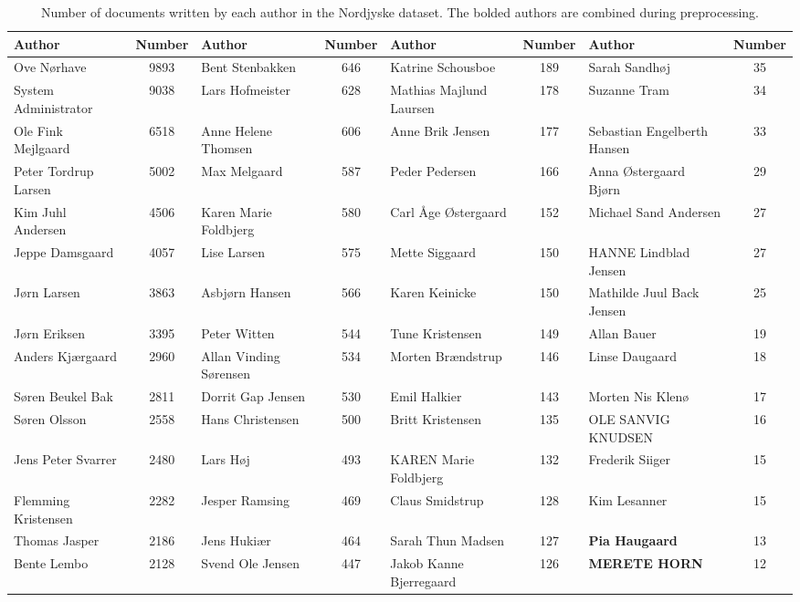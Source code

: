 \begin{table}[h]
	\caption{Number of documents written by each author in the Nordjyske dataset.
	The bolded authors are combined during preprocessing.}
	\label{tab:author_table}
	\centering
	\scriptsize
	\begin{tabular}{l|c|l|c|l|c|l|c}
		Author                & Number & Author                     & Number & Author                       & Number & Author                       & Number \\
		\midrule
		Ove Nørhave & 9893 & Bent Stenbakken & 646 & Katrine Schousboe & 189 & Sarah Sandhøj & 35 \\
		System Administrator & 9038 & Lars Hofmeister & 628 & Mathias Majlund Laursen & 178 & Suzanne Tram & 34 \\
		Ole Fink Mejlgaard & 6518 & Anne Helene Thomsen & 606 & Anne Brik Jensen & 177 & Sebastian Engelberth Hansen & 33 \\
		Peter Tordrup Larsen & 5002 & Max Melgaard & 587 & Peder Pedersen & 166 & Anna Østergaard Bjørn & 29 \\
		Kim Juhl Andersen & 4506 & Karen Marie Foldbjerg & 580 & Carl Åge Østergaard & 152 & Michael Sand Andersen & 27 \\
		Jeppe Damsgaard & 4057 & Lise Larsen & 575 & Mette Siggaard & 150 & HANNE Lindblad Jensen & 27 \\
		Jørn Larsen & 3863 & Asbjørn Hansen & 566 & Karen Keinicke & 150 & Mathilde Juul Back Jensen & 25 \\
		Jørn Eriksen & 3395 & Peter Witten & 544 & Tune Kristensen & 149 & Allan Bauer & 19 \\
		Anders Kjærgaard & 2960 & Allan Vinding Sørensen & 534 & Morten Brændstrup & 146 & Linse Daugaard & 18 \\
		Søren Beukel Bak & 2811 & Dorrit Gap Jensen & 530 & Emil Halkier & 143 & Morten Nis Klenø & 17 \\
		Søren Olsson & 2558 & Hans Christensen & 500 & Britt Kristensen & 135 & OLE SANVIG KNUDSEN & 16 \\
		Jens Peter Svarrer & 2480 & Lars Høj & 493 & KAREN Marie Foldbjerg & 132 & Frederik Siiger & 15 \\
		Flemming Kristensen & 2282 & Jesper Ramsing & 469 & Claus Smidstrup & 128 & Kim Lesanner & 15 \\
		Thomas Jasper & 2186 & Jens Hukiær & 464 & Sarah Thun Madsen & 127 & \textbf{Pia Haugaard} & 13 \\
		Bente Lembo & 2128 & Svend Ole Jensen & 447 & Jakob Kanne Bjerregaard & 126 & \textbf{MERETE HORN} & 12 \\

\end{tabular}
\end{table}

